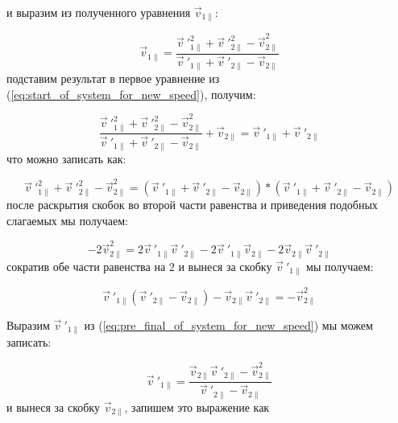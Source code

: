 \documentclass[a4paper]{article}
\begin{document}
и выразим из полученного уравнения $ \vec{v}_{1\parallel} $:

\begin{equation}
    \vec{v}_{1\parallel} = \frac{\vec{v}\ '^2_{1\parallel} + \vec{v}\ '^2_{2\parallel} - \vec{v}^2_{2\parallel}}{\vec{v}\ '_{1\parallel} + \vec{v}\ '_{2\parallel} - \vec{v}_{2\parallel}}
\end{equation}
подставим результат в первое уравнение из (\ref{eq:start_of_system_for_new_speed}), получим:

\begin{equation}
    \frac{\vec{v}\ '^2_{1\parallel} + \vec{v}\ '^2_{2\parallel} - \vec{v}^2_{2\parallel}}{\vec{v}\ '_{1\parallel} + \vec{v}\ '_{2\parallel} - \vec{v}_{2\parallel}} + \vec{v}_{2\parallel} = \vec{v}\ '_{1\parallel} + \vec{v}\ '_{2\parallel}
\end{equation}
что можно записать как:

\begin{equation}
    \vec{v}\ '^2_{1\parallel} + \vec{v}\ '^2_{2\parallel} - \vec{v}^2_{2\parallel} = (\vec{v}\ '_{1\parallel} + \vec{v}\ '_{2\parallel} - \vec{v}_{2\parallel})*(\vec{v}\ '_{1\parallel} + \vec{v}\ '_{2\parallel} - \vec{v}_{2\parallel})
\end{equation}
после раскрытия скобок во второй части равенства и приведения подобных слагаемых мы получаем:

\begin{equation}
    -2 \vec{v}^2_{2\parallel} = 2 \vec{v}\ '_{1\parallel} \vec{v}\ '_{2\parallel} - 2 \vec{v}\ '_{1\parallel} \vec{v}_{2\parallel} - 2 \vec{v}_{2\parallel} \vec{v}\ '_{2\parallel}
\end{equation}
сократив обе части равенства на $ 2 $ и вынеся за скобку $ \vec{v}\ '_{1\parallel} $ мы получаем:

\begin{equation}\label{eq:pre_final_of_system_for_new_speed}
    \vec{v}\ '_{1\parallel} (\vec{v}\ '_{2\parallel} - \vec{v}_{2\parallel}) - \vec{v}_{2\parallel} \vec{v}\ '_{2\parallel} = -\vec{v}^2_{2\parallel} 
\end{equation}

Выразим $ \vec{v}\ '_{1\parallel} $ из (\ref{eq:pre_final_of_system_for_new_speed}) мы можем записать:

\begin{equation}
    \vec{v}\ '_{1\parallel} = \frac{\vec{v}_{2\parallel} \vec{v}\ '_{2\parallel} - \vec{v}^2_{2\parallel}}{\vec{v}\ '_{2\parallel} - \vec{v}_{2\parallel}}
\end{equation}
и вынеся за скобку $ \vec{v}_{2\parallel} $, запишем это выражение как
\end{document}
